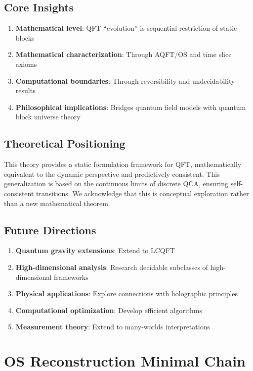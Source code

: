 \documentclass[11pt]{article}
\theoremstyle{definition}
\theoremstyle{remark}
\begin{document}
\subsection{Core Insights}

\begin{enumerate}
\item \textbf{Mathematical level}: QFT ``evolution'' is sequential restriction of static blocks
\item \textbf{Mathematical characterization}: Through AQFT/OS and time slice axioms
\item \textbf{Computational boundaries}: Through reversibility and undecidability results
\item \textbf{Philosophical implications}: Bridges quantum field models with quantum block universe theory
\end{enumerate}

\subsection{Theoretical Positioning}

This theory provides a static formulation framework for QFT, mathematically equivalent to the dynamic perspective and predictively consistent. This generalization is based on the continuous limits of discrete QCA, ensuring self-consistent transitions. We acknowledge that this is conceptual exploration rather than a new mathematical theorem.

\subsection{Future Directions}

\begin{enumerate}
\item \textbf{Quantum gravity extensions}: Extend to LCQFT
\item \textbf{High-dimensional analysis}: Research decidable subclasses of high-dimensional frameworks
\item \textbf{Physical applications}: Explore connections with holographic principles
\item \textbf{Computational optimization}: Develop efficient algorithms
\item \textbf{Measurement theory}: Extend to many-worlds interpretations
\end{enumerate}

\appendix

\section{OS Reconstruction Minimal Chain}\label{app:os}
\end{document}
